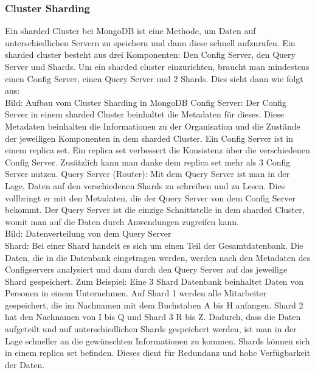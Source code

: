 \subsubsection{Cluster Sharding}
Ein sharded Cluster bei MongoDB ist eine Methode, um Daten auf unterschiedlichen Servern zu speichern und dann diese schnell aufzurufen. Ein sharded cluster besteht aus drei Komponenten: Den Config Server, den Query Server und Shards. Um ein sharded cluster einzurichten, braucht man mindestens einen Config Server, einen Query Server und 2 Shards. Dies sieht dann wie folgt aus:
\\
Bild: Aufbau vom Cluster Sharding in MongoDB
Config Server: Der Config Server in einem sharded Cluster beinhaltet die Metadaten für dieses. Diese Metadaten beinhalten die Informationen zu der Organisation und die Zustände der jeweiligen Komponenten in dem sharded Cluster.  Ein Config Server ist in einem replica set. Ein replica set verbessert die Konsistenz über die verschiedenen Config Server. Zusätzlich kann man danke dem replica set mehr als 3 Config Server nutzen.
Query Server (Router): Mit dem Query Server ist man in der Lage, Daten auf den verschiedenen Shards zu schreiben und zu Lesen. Dies vollbringt er mit den Metadaten, die der Query Server von dem Config Server bekommt. Der Query Server ist die einzige Schnittstelle in dem sharded Cluster, womit man auf die Daten durch Anwendungen zugreifen kann. 
\\
Bild: Datenverteilung von dem Query Server
\\
Shard: Bei einer Shard handelt es sich um einen Teil der Gesamtdatenbank. Die Daten, die in die Datenbank eingetragen werden, werden nach den Metadaten des Configservers analysiert und dann durch den Query Server auf das jeweilige Shard gespeichert. Zum Beispiel: Eine 3 Shard Datenbank beinhaltet Daten von Personen in einem Unternehmen. Auf Shard 1 werden alle Mitarbeiter gespeichert, die im Nachnamen mit dem Buchstaben A bis H anfangen. Shard 2 hat den Nachnamen von I bis Q und Shard 3 R bis Z. Dadurch, dass die Daten aufgeteilt und auf unterschiedlichen Shards gespeichert werden, ist man in der Lage schneller an die gewünschten Informationen zu kommen. Shards können sich in einem replica set befinden. Dieses dient für Redundanz  und hohe Verfügbarkeit der Daten.
